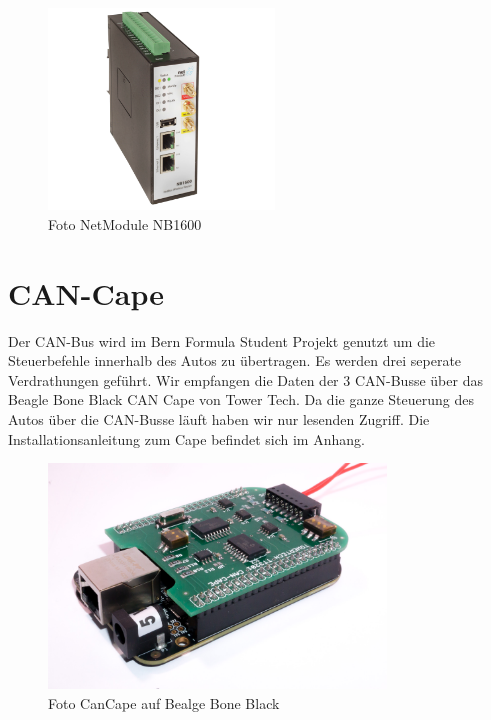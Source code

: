 \begin{figure}[hbtp]
	\center
	\includegraphics[width=6cm]{bilder/netmodule.png}
	\caption{Foto NetModule NB1600}
	\label{fig:netbox}
\end{figure}


\section{CAN-Cape}

 Der CAN-Bus wird im Bern Formula Student Projekt genutzt um die Steuerbefehle innerhalb des Autos zu übertragen. Es werden drei seperate Verdrathungen geführt. Wir empfangen die Daten der 3 CAN-Busse über das Beagle Bone Black CAN Cape von Tower Tech. Da die ganze Steuerung des Autos über die CAN-Busse läuft haben wir nur lesenden Zugriff. Die Installationsanleitung zum Cape befindet sich im Anhang.

\begin{figure}[hbtp]
	\center
	\includegraphics[width=0.8\textwidth]{bilder/foto-4.jpg}
	\caption{Foto CanCape auf Bealge Bone Black}
	\label{fig:CanCape}
\end{figure}

